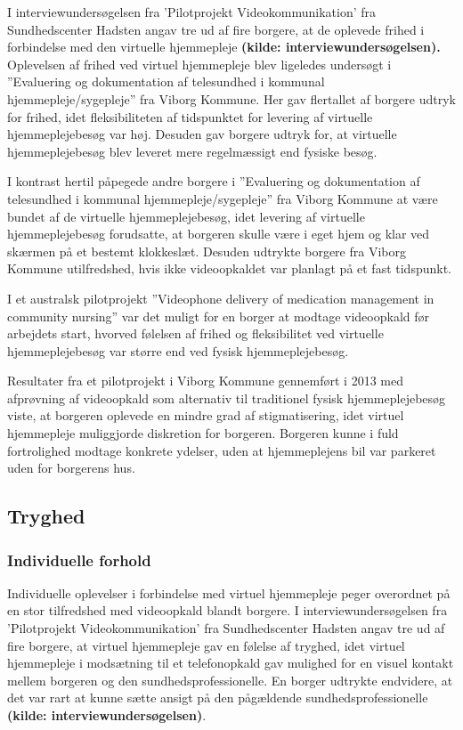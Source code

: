 I interviewundersøgelsen fra ’Pilotprojekt Videokommunikation’ fra Sundhedscenter Hadsten angav tre ud af fire borgere, at de oplevede frihed i forbindelse med den virtuelle hjemmepleje \textbf{(kilde: interviewundersøgelsen). 
} 
Oplevelsen af frihed ved virtuel hjemmepleje blev ligeledes undersøgt i ”Evaluering og dokumentation af telesundhed i kommunal hjemmepleje/sygepleje” fra Viborg Kommune. Her gav flertallet af borgere udtryk for frihed, idet fleksibiliteten af tidspunktet for levering af virtuelle hjemmeplejebesøg var høj. Desuden gav borgere udtryk for, at virtuelle hjemmeplejebesøg blev leveret mere regelmæssigt end fysiske besøg\cite{kandidat}.
 
I kontrast hertil påpegede andre borgere i ”Evaluering og dokumentation af telesundhed i kommunal hjemmepleje/sygepleje” fra Viborg Kommune at være bundet af de virtuelle hjemmeplejebesøg, idet levering af virtuelle hjemmeplejebesøg forudsatte, at borgeren skulle være i eget hjem og klar ved skærmen på et bestemt klokkeslæt. Desuden udtrykte borgere fra Viborg Kommune utilfredshed, hvis ikke videoopkaldet var planlagt på et fast tidspunkt\cite{kandidat}.
 
I et australsk pilotprojekt ”Videophone delivery of medication management in community nursing” var det muligt for en borger at modtage videoopkald før arbejdets start, hvorved følelsen af frihed og fleksibilitet ved virtuelle hjemmeplejebesøg var større end ved fysisk hjemmeplejebesøg\cite{wade}.
 
Resultater fra et pilotprojekt i Viborg Kommune gennemført i 2013 med afprøvning af videoopkald som alternativ til traditionel fysisk hjemmeplejebesøg viste, at borgeren oplevede en mindre grad af stigmatisering, idet virtuel hjemmepleje muliggjorde diskretion for borgeren. Borgeren kunne i fuld fortrolighed modtage konkrete ydelser, uden at hjemmeplejens bil var parkeret uden for borgerens hus\cite{kandidat}.

\subsection{Tryghed}
\subsubsection{Individuelle forhold}
Individuelle oplevelser i forbindelse med virtuel hjemmepleje peger overordnet på en stor tilfredshed med videoopkald blandt borgere. I interviewundersøgelsen fra ’Pilotprojekt Videokommunikation’ fra Sundhedscenter Hadsten angav tre ud af fire borgere, at virtuel hjemmepleje gav en følelse af tryghed, idet virtuel hjemmepleje i modsætning til et telefonopkald gav mulighed for en visuel kontakt mellem borgeren og den sundhedsprofessionelle. En borger udtrykte endvidere, at det var rart at kunne sætte ansigt på den pågældende sundhedsprofessionelle \textbf{(kilde: interviewundersøgelsen)}.

